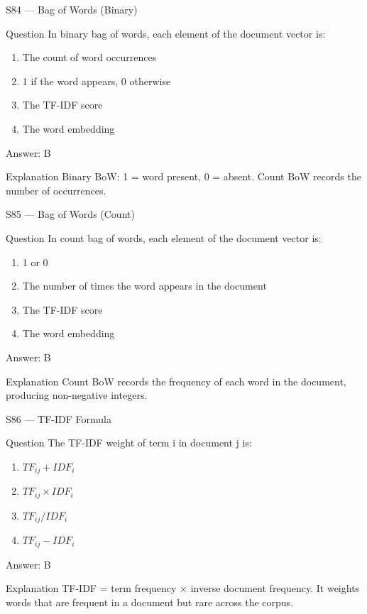 \documentclass[aspectratio=169,8pt]{beamer}
\begin{document}
	\begin{frame}{S84 --- Bag of Words (Binary)}
		\begin{block}{Question}
			In binary bag of words, each element of the document vector is:
			\begin{enumerate}
				\item The count of word occurrences
				\item 1 if the word appears, 0 otherwise
				\item The TF-IDF score
				\item The word embedding
			\end{enumerate}
		\end{block}
		\begin{exampleblock}{Answer: B}\end{exampleblock}
		\begin{block}{Explanation}
			Binary BoW: 1 = word present, 0 = absent. Count BoW records the number of occurrences.
		\end{block}
	\end{frame}
	
	\begin{frame}{S85 --- Bag of Words (Count)}
		\begin{block}{Question}
			In count bag of words, each element of the document vector is:
			\begin{enumerate}
				\item 1 or 0
				\item The number of times the word appears in the document
				\item The TF-IDF score
				\item The word embedding
			\end{enumerate}
		\end{block}
		\begin{exampleblock}{Answer: B}\end{exampleblock}
		\begin{block}{Explanation}
			Count BoW records the frequency of each word in the document, producing non-negative integers.
		\end{block}
	\end{frame}
	
	\begin{frame}{S86 --- TF-IDF Formula}
		\begin{block}{Question}
			The TF-IDF weight of term i in document j is:
			\begin{enumerate}
				\item $TF_{ij} + IDF_i$
				\item $TF_{ij} \times IDF_i$
				\item $TF_{ij} / IDF_i$
				\item $TF_{ij} - IDF_i$
			\end{enumerate}
		\end{block}
		\begin{exampleblock}{Answer: B}\end{exampleblock}
		\begin{block}{Explanation}
			TF-IDF = term frequency × inverse document frequency. It weights words that are frequent in a document but rare across the corpus.
		\end{block}
	\end{frame}
	
\end{document}
